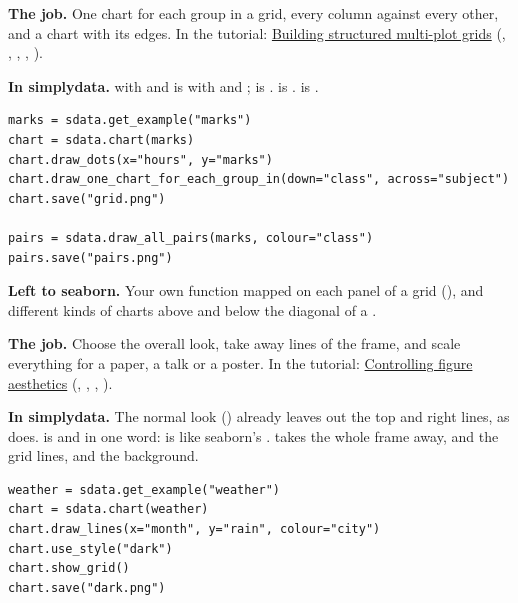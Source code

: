 \textbf{The job.} One chart for each group in a grid, every column against every other, and a chart
with its edges. In the tutorial: \href{https://seaborn.pydata.org/tutorial/axis_grids.html}{Building
structured multi-plot grids} (, , , ,
).

\textbf{In simplydata.}  with  and
 is  with  and ;  is
.  is . 
is .

\begin{lstlisting}[style=py]
marks = sdata.get_example("marks")
chart = sdata.chart(marks)
chart.draw_dots(x="hours", y="marks")
chart.draw_one_chart_for_each_group_in(down="class", across="subject")
chart.save("grid.png")

pairs = sdata.draw_all_pairs(marks, colour="class")
pairs.save("pairs.png")
\end{lstlisting}

\textbf{Left to seaborn.} Your own function mapped on each panel of a grid (), and
different kinds of charts above and below the diagonal of a .


\textbf{The job.} Choose the overall look, take away lines of the frame, and scale everything for a
paper, a talk or a poster. In the tutorial:
\href{https://seaborn.pydata.org/tutorial/aesthetics.html}{Controlling figure aesthetics}
(, , , ).

\textbf{In simplydata.} The normal look () already leaves out the top and right lines,
as  does.  is  and  in one word:
 is like seaborn's .  takes the whole frame away,
 and  the grid lines, and  the
background.

\begin{lstlisting}[style=py]
weather = sdata.get_example("weather")
chart = sdata.chart(weather)
chart.draw_lines(x="month", y="rain", colour="city")
chart.use_style("dark")
chart.show_grid()
chart.save("dark.png")
\end{lstlisting}

